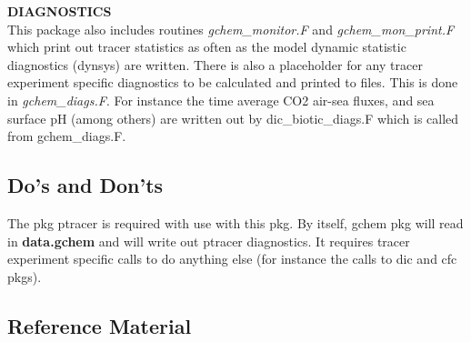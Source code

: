 \noindent
{{\bf DIAGNOSTICS}}\\
This package also includes routines {\it gchem\_monitor.F} and 
{\it gchem\_mon\_print.F} which print out tracer statistics
as often as the model dynamic statistic diagnostics (dynsys) are written.
There is also a placeholder for any tracer experiment
specific diagnostics to be calculated and printed to files.
This is done in {\it gchem\_diags.F}. For instance the time average CO2
air-sea fluxes, and sea surface pH (among others) are written
out by dic\_biotic\_diags.F which is called from gchem\_diags.F.

\subsection{Do's and Don'ts}

The pkg ptracer is required with use with this pkg.
By itself, gchem pkg will read in {\bf data.gchem} and will
write out ptracer diagnostics. It requires tracer experiment
specific calls to do anything else (for instance the calls
to dic and cfc pkgs).

\subsection{Reference Material}

